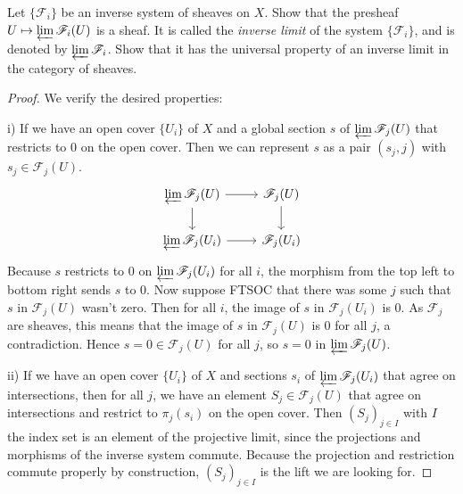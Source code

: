 \begin{exercise}%
	Let $\{\mathscr{F}_i\}$ be an inverse system of sheaves on $X $. Show that the presheaf $U\mapsto \varprojlim \mathscr{F}_i(U)$ is a sheaf. It is called the \textit{inverse limit} of the system $\{\mathscr{F}_i\}$, and is denoted by $\varprojlim \mathscr{F}_i $. Show that it has the universal property of an inverse limit in the category of sheaves.
\end{exercise}
\begin{proof}
	We verify the desired properties:

	i) If we have an open cover $\{U_i\}   $ of $X $ and a global section $s $ of $\varprojlim \mathscr{F}_j(U) $ that restricts to 0 on the open cover.
	Then we can represent $s $ as a pair $(s_j,j) $ with $s_j \in \mathscr{F}_j(U) $.
	\[
	\begin{tikzcd}
	\varprojlim \mathscr{F}_j(U) & \mathscr{F}_j(U)\\
	\varprojlim \mathscr{F}_j(U_i) & \mathscr{F}_j(U_i)
	\arrow[from=1-1,to=1-2]
	\arrow[from=1-1,to=2-1]
	\arrow[from=2-1,to=2-2]
	\arrow[from=1-2,to=2-2]
	\end{tikzcd}
	\]
	Because $s $ restricts to 0 on $\varprojlim \mathscr{F}_j(U_i) $ for all $i $, the morphism from the top left to bottom right sends $s $ to 0.
	Now suppose FTSOC that there was some $j $ such that $s $ in $\mathscr{F}_j(U) $ wasn't zero.
	Then for all $i$, the image of $s$ in $\mathscr{F}_j(U_i) $ is 0.
	As $\mathscr{F}_j $ are sheaves, this means that the image of $s $ in $\mathscr{F}_j(U) $ is $0 $ for all $j $, a contradiction.
	Hence $s =0 \in \mathscr{F}_j(U)$ for all $j $, so $s=0 $ in $\varprojlim \mathscr{F}_j(U) $.

	ii) If we have an open cover $\{U_i\}   $ of $X $ and sections $s_i $ of $\varprojlim \mathscr{F}_j(U_i) $ that agree on intersections, then for all $j $, we have an element $S_{j} \in \mathscr{F}_j(U) $ that agree on intersections and restrict to $\pi_j(s_i)$ on the open cover.
	Then $(S_j)_{j\in I} $ with $I $ the index set is an element of the projective limit, since the projections and morphisms of the inverse system commute.
	Because the projection and restriction commute properly by construction, $(S_j)_{j\in I} $ is the lift we are looking for.
\end{proof}

